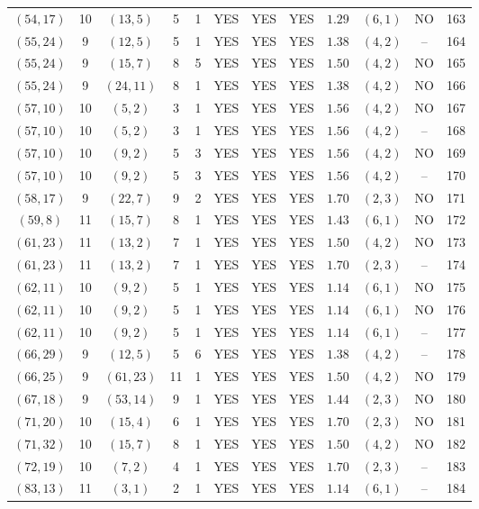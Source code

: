 \begin{longtable}{|c|c|c|c|c|c|c|c|c|c|c|c|}
$(54,17)$ & 10 & $(13,5)$ & 5 & 1 & YES & YES & YES & $1.29$ & $(6,1)$ & NO & 163\\
$(55,24)$ & 9 & $(12,5)$ & 5 & 1 & YES & YES & YES & $1.38$ & $(4,2)$ & -- & 164\\
$(55,24)$ & 9 & $(15,7)$ & 8 & 5 & YES & YES & YES & $1.50$ & $(4,2)$ & NO & 165\\
$(55,24)$ & 9 & $(24,11)$ & 8 & 1 & YES & YES & YES & $1.38$ & $(4,2)$ & NO & 166\\
$(57,10)$ & 10 & $(5,2)$ & 3 & 1 & YES & YES & YES & $1.56$ & $(4,2)$ & NO & 167\\
$(57,10)$ & 10 & $(5,2)$ & 3 & 1 & YES & YES & YES & $1.56$ & $(4,2)$ & -- & 168\\
$(57,10)$ & 10 & $(9,2)$ & 5 & 3 & YES & YES & YES & $1.56$ & $(4,2)$ & NO & 169\\
$(57,10)$ & 10 & $(9,2)$ & 5 & 3 & YES & YES & YES & $1.56$ & $(4,2)$ & -- & 170\\
$(58,17)$ & 9 & $(22,7)$ & 9 & 2 & YES & YES & YES & $1.70$ & $(2,3)$ & NO & 171\\
$(59,8)$ & 11 & $(15,7)$ & 8 & 1 & YES & YES & YES & $1.43$ & $(6,1)$ & NO & 172\\
$(61,23)$ & 11 & $(13,2)$ & 7 & 1 & YES & YES & YES & $1.50$ & $(4,2)$ & NO & 173\\
$(61,23)$ & 11 & $(13,2)$ & 7 & 1 & YES & YES & YES & $1.70$ & $(2,3)$ & -- & 174\\
$(62,11)$ & 10 & $(9,2)$ & 5 & 1 & YES & YES & YES & $1.14$ & $(6,1)$ & NO & 175\\
$(62,11)$ & 10 & $(9,2)$ & 5 & 1 & YES & YES & YES & $1.14$ & $(6,1)$ & NO & 176\\
$(62,11)$ & 10 & $(9,2)$ & 5 & 1 & YES & YES & YES & $1.14$ & $(6,1)$ & -- & 177\\
$(66,29)$ & 9 & $(12,5)$ & 5 & 6 & YES & YES & YES & $1.38$ & $(4,2)$ & -- & 178\\
$(66,25)$ & 9 & $(61,23)$ & 11 & 1 & YES & YES & YES & $1.50$ & $(4,2)$ & NO & 179\\
$(67,18)$ & 9 & $(53,14)$ & 9 & 1 & YES & YES & YES & $1.44$ & $(2,3)$ & NO & 180\\
$(71,20)$ & 10 & $(15,4)$ & 6 & 1 & YES & YES & YES & $1.70$ & $(2,3)$ & NO & 181\\
$(71,32)$ & 10 & $(15,7)$ & 8 & 1 & YES & YES & YES & $1.50$ & $(4,2)$ & NO & 182\\
$(72,19)$ & 10 & $(7,2)$ & 4 & 1 & YES & YES & YES & $1.70$ & $(2,3)$ & -- & 183\\
$(83,13)$ & 11 & $(3,1)$ & 2 & 1 & YES & YES & YES & $1.14$ & $(6,1)$ & -- & 184\\

\end{longtable}
